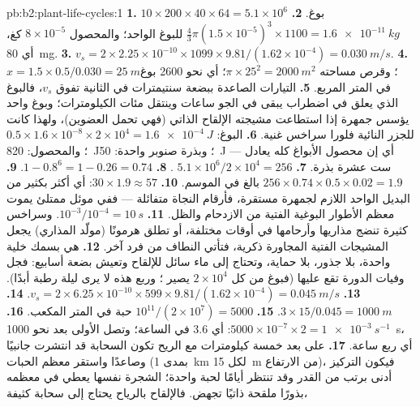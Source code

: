 \begin{solution}{pb:b2:plant-life-cycles:1}
\textbf{1.} $10\times 200\times 40\times 64 = 5.1\times 10^{6}$
بوغ.
\textbf{2.} $\tfrac43\pi(1.5\times 10^{-5})^3\times 1100 =
\qty{1.6e-11}{kg}$ للبوغ الواحد؛ والمحصول $8\times 10^{-5}$ كغ، أي \qty{80}{mg}.
\textbf{3.} $v_s = 2\times 2.25\times 10^{-10}\times 1099\times
9.81/(1.62\times 10^{-4}) = \qty{0.030}{m/s}$.
\textbf{4.} $x = 1.5\times 0.5/0.030 = \qty{25}{m}$؛ وقرص مساحته
$\pi\times 25^2 = \qty{2000}{m^2}$؛ أي نحو \num{2600} بوغ في المتر
المربع.
\textbf{5.} التيارات الصاعدة ببضعة سنتيمترات في الثانية تفوق $v_s$،
فالبوغ الذي يعلق في اضطراب يبقى في الجو ساعات وينتقل مئات
الكيلومترات؛ وبوغ واحد يؤسس جمهرة إذا استطاعت مشيجته الإلقاح الذاتي
(فهي تحمل العضوين)، ولهذا كانت للجزر النائية فلورا سراخس غنية.
\textbf{6.} البوغ: $0.5\times 1.6\times 10^{-8}\times 2\times 10^{4} =
\qty{1.6e-4}{J}$؛ والمحصول: \qty{820}{J}؛ وبذرة صنوبر واحدة: \qty{50}{J} ---
أي إن محصول الأبواغ كله يعادل ست عشرة بذرة.
\textbf{7.} $5.1\times 10^{6}/2\times 10^{4} = 256$ .
\textbf{8.} $1 - 0.8^{6} = 1 - 0.26 = 0.74$.
\textbf{9.} $256\times 0.74\times 0.5\times 0.02 = 1.9$  بالغ
في الموسم.
\textbf{10.} $30\times 1.9 \approx 57$: أي أكثر بكثير من البديل
الواحد اللازم لجمهرة مستقرة، فأرقام النجاة متفائلة --- ففي موئل
ممتلئ يموت معظم الأطوار البوغية الفتية من الازدحام والظل.
\textbf{11.} $10^{-3}/10^{-4} = \qty{10}{s}$. وسراخس كثيرة تنضج
مذاريها وأرحامها في أوقات مختلفة، أو تطلق هرمونًا (مولّد المذاري)
يجعل المشيجات الفتية المجاورة ذكرية، فتأتي النطاف من فرد آخر.
\textbf{12.} هي بسمك خلية واحدة، بلا جذور، بلا حماية، وتحتاج إلى
ماء سائل للإلقاح وتعيش بضعة أسابيع: فجل وفيات الدورة تقع عليها
(فبوغ من كل $2\times 10^{4}$ يصير ؛ وربع هذه لا يرى ليلة رطبة
أبدًا).
\textbf{13.} $v_s = 2\times 6.25\times 10^{-10}\times 599\times
9.81/(1.62\times 10^{-4}) = \qty{0.045}{m/s}$.
\textbf{14.} $3\times 15/0.045 = \qty{1000}{m}$.
\textbf{15.} $10^{11}/(2\times 10^{7}) = \num{5000}$ حبة في المتر المكعب.
\textbf{16.} $5000\times 10^{-7}\times 2 = \qty{1e-3}{s^{-1}}$: أي 3.6 في
الساعة؛ وتصل الأولى بعد نحو \qty{1000}{s}، أي ربع
ساعة.
\textbf{17.} على بعد خمسة كيلومترات مع الريح تكون السحابة قد انتشرت
جانبيًا وصاعدًا واستقر معظم الحبات (بمدى \qty{1}{km} لكل
\qty{15}{m} من الارتفاع)، فيكون التركيز أدنى برتب من القدر وقد
تنتظر  أيامًا لحبة واحدة؛  الشجرة نفسها يعطي في معظمه
بذورًا ملقحة ذاتيًا تجهض. فالإلقاح بالرياح يحتاج إلى سحابة كثيفة،

\end{solution}
